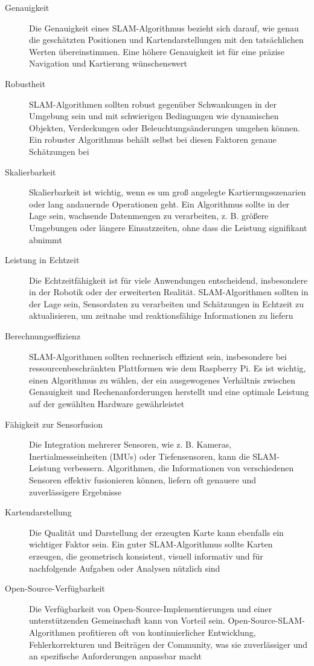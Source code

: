 \begin{description}
    \item[Genauigkeit]{Die Genauigkeit eines SLAM-Algorithmus bezieht sich darauf, wie genau die geschätzten Positionen und Kartendarstellungen mit den tatsächlichen Werten übereinstimmen. Eine höhere Genauigkeit ist für eine präzise Navigation und Kartierung wünschenswert}
    \item[Robustheit]{SLAM-Algorithmen sollten robust gegenüber Schwankungen in der Umgebung sein und mit schwierigen Bedingungen wie dynamischen Objekten, Verdeckungen oder Beleuchtungsänderungen umgehen können. Ein robuster Algorithmus behält selbst bei diesen Faktoren genaue Schätzungen bei} 
    \item[Skalierbarkeit]{Skalierbarkeit ist wichtig, wenn es um groß angelegte Kartierungsszenarien oder lang andauernde Operationen geht. Ein Algorithmus sollte in der Lage sein, wachsende Datenmengen zu verarbeiten, z. B. größere Umgebungen oder längere Einsatzzeiten, ohne dass die Leistung signifikant abnimmt}
    \item[Leistung in Echtzeit]{Die Echtzeitfähigkeit ist für viele Anwendungen entscheidend, insbesondere in der Robotik oder der erweiterten Realität. SLAM-Algorithmen sollten in der Lage sein, Sensordaten zu verarbeiten und Schätzungen in Echtzeit zu aktualisieren, um zeitnahe und reaktionsfähige Informationen zu liefern}
    \item[Berechnungseffizienz]{SLAM-Algorithmen sollten rechnerisch effizient sein, insbesondere bei ressourcenbeschränkten Plattformen wie dem Raspberry Pi. Es ist wichtig, einen Algorithmus zu wählen, der ein ausgewogenes Verhältnis zwischen Genauigkeit und Rechenanforderungen herstellt und eine optimale Leistung auf der gewählten Hardware gewährleistet}
    \item[Fähigkeit zur Sensorfusion]{Die Integration mehrerer Sensoren, wie z. B. Kameras, Inertialmesseinheiten (IMUs) oder Tiefensensoren, kann die SLAM-Leistung verbessern. Algorithmen, die Informationen von verschiedenen Sensoren effektiv fusionieren können, liefern oft genauere und zuverlässigere Ergebnisse}
    \item[Kartendarstellung]{Die Qualität und Darstellung der erzeugten Karte kann ebenfalls ein wichtiger Faktor sein. Ein guter SLAM-Algorithmus sollte Karten erzeugen, die geometrisch konsistent, visuell informativ und für nachfolgende Aufgaben oder Analysen nützlich sind} 
    \item[Open-Source-Verfügbarkeit]{Die Verfügbarkeit von Open-Source-Implementierungen und einer unterstützenden Gemeinschaft kann von Vorteil sein. Open-Source-SLAM-Algorithmen profitieren oft von kontinuierlicher Entwicklung, Fehlerkorrekturen und Beiträgen der Community, was sie zuverlässiger und an spezifische Anforderungen anpassbar macht}
\end{description}

